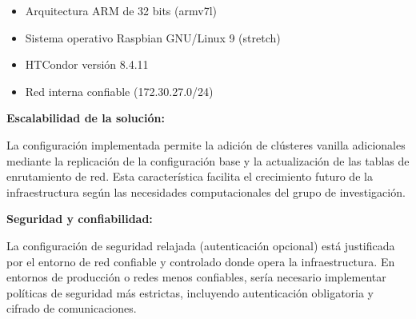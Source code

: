 \begin{itemize}
	\item Arquitectura ARM de 32 bits (armv7l)
	\item Sistema operativo Raspbian GNU/Linux 9 (stretch)
	\item HTCondor versión 8.4.11
	\item Red interna confiable (172.30.27.0/24)
\end{itemize}

\textbf{Escalabilidad de la solución:}

La configuración implementada permite la adición de clústeres vanilla adicionales mediante la replicación de la configuración base y la actualización de las tablas de enrutamiento de red. Esta característica facilita el crecimiento futuro de la infraestructura según las necesidades computacionales del grupo de investigación.

\textbf{Seguridad y confiabilidad:}

La configuración de seguridad relajada (autenticación opcional) está justificada por el entorno de red confiable y controlado donde opera la infraestructura. En entornos de producción o redes menos confiables, sería necesario implementar políticas de seguridad más estrictas, incluyendo autenticación obligatoria y cifrado de comunicaciones.
